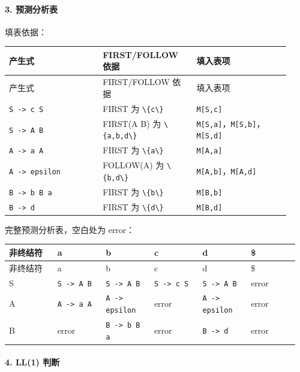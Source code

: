 \documentclass[UTF8]{ctexart}
\begin{document}
\paragraph*{3. 预测分析表}

填表依据：

\begin{longtable}{|p{0.31\linewidth}|p{0.31\linewidth}|p{0.31\linewidth}|}
\hline
产生式 & FIRST/FOLLOW 依据 & 填入表项 \\
\hline
\endfirsthead
产生式 & FIRST/FOLLOW 依据 & 填入表项 \\
\hline
\endhead
\texttt{S -> c S} & FIRST 为 \texttt{\textbackslash{}\{c\textbackslash{}\}} & \texttt{M[S,c]} \\
\hline
\texttt{S -> A B} & FIRST(A B) 为 \texttt{\textbackslash{}\{a,b,d\textbackslash{}\}} & \texttt{M[S,a]}，\texttt{M[S,b]}，\texttt{M[S,d]} \\
\hline
\texttt{A -> a A} & FIRST 为 \texttt{\textbackslash{}\{a\textbackslash{}\}} & \texttt{M[A,a]} \\
\hline
\texttt{A -> epsilon} & FOLLOW(A) 为 \texttt{\textbackslash{}\{b,d\textbackslash{}\}} & \texttt{M[A,b]}，\texttt{M[A,d]} \\
\hline
\texttt{B -> b B a} & FIRST 为 \texttt{\textbackslash{}\{b\textbackslash{}\}} & \texttt{M[B,b]} \\
\hline
\texttt{B -> d} & FIRST 为 \texttt{\textbackslash{}\{d\textbackslash{}\}} & \texttt{M[B,d]} \\
\hline
\end{longtable}

完整预测分析表，空白处为 error：

\begin{longtable}{|p{0.16\linewidth}|p{0.16\linewidth}|p{0.16\linewidth}|p{0.16\linewidth}|p{0.16\linewidth}|p{0.16\linewidth}|}
\hline
非终结符 & a & b & c & d & \$ \\
\hline
\endfirsthead
非终结符 & a & b & c & d & \$ \\
\hline
\endhead
S & \texttt{S -> A B} & \texttt{S -> A B} & \texttt{S -> c S} & \texttt{S -> A B} & error \\
\hline
A & \texttt{A -> a A} & \texttt{A -> epsilon} & error & \texttt{A -> epsilon} & error \\
\hline
B & error & \texttt{B -> b B a} & error & \texttt{B -> d} & error \\
\hline
\end{longtable}

\paragraph*{4. LL(1) 判断}
\end{document}
